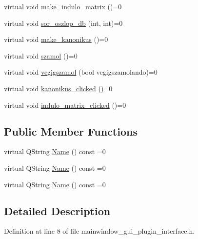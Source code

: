 \begin{DoxyCompactItemize}
\item 
virtual void \hyperlink{classMainwindow__Gui__Plugin__Interface_a6f6ad76f05dee7b337e2a92e517f059f}{make\+\_\+indulo\+\_\+matrix} ()=0
\item 
virtual void \hyperlink{classMainwindow__Gui__Plugin__Interface_ac9422e891b27c71e494d8e48b85fd2dd}{sor\+\_\+oszlop\+\_\+db} (int, int)=0
\item 
virtual void \hyperlink{classMainwindow__Gui__Plugin__Interface_a001c5676bdc263a8f305bb48edfc30c4}{make\+\_\+kanonikus} ()=0
\item 
virtual void \hyperlink{classMainwindow__Gui__Plugin__Interface_aca2e7efeb264c5555dd4ae21bdba009b}{szamol} ()=0
\item 
virtual void \hyperlink{classMainwindow__Gui__Plugin__Interface_a5ef9f7b5d5befab0f74eccefe9313062}{vegigszamol} (bool vegigszamolando)=0
\item 
virtual void \hyperlink{classMainwindow__Gui__Plugin__Interface_a2899609024d5d23915810d1814dfe819}{kanonikus\+\_\+clicked} ()=0
\item 
virtual void \hyperlink{classMainwindow__Gui__Plugin__Interface_a82bc683c6515109f47d75337ff17dd53}{indulo\+\_\+matrix\+\_\+clicked} ()=0
\end{DoxyCompactItemize}
\subsection*{Public Member Functions}
\begin{DoxyCompactItemize}
\item 
virtual Q\+String \hyperlink{classMainwindow__Gui__Plugin__Interface_a5cbc7bb0e3bb477472b91f65e916db8e}{Name} () const =0
\item 
virtual Q\+String \hyperlink{classMainwindow__Gui__Plugin__Interface_a5cbc7bb0e3bb477472b91f65e916db8e}{Name} () const =0
\item 
virtual Q\+String \hyperlink{classMainwindow__Gui__Plugin__Interface_a5cbc7bb0e3bb477472b91f65e916db8e}{Name} () const =0
\end{DoxyCompactItemize}


\subsection{Detailed Description}


Definition at line 8 of file mainwindow\+\_\+gui\+\_\+plugin\+\_\+interface.\+h.



